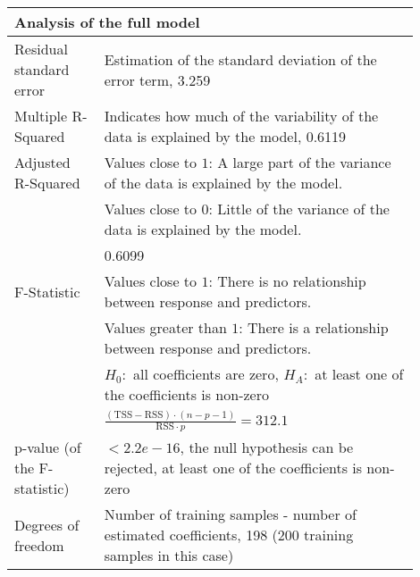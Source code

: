 {\begin{minipage}{\linewidth}
\begin{table}[H]
\begin{tabular}{|p{0.2\linewidth}|p{0.7\linewidth}|}
					\hline
					\multicolumn{2}{|l|}{\textbf{Analysis of the full model}}\\
					\hline
					Residual standard error
						& Estimation of the standard deviation of the error term, 3.259 \\
					Multiple R-Squared
						& Indicates how much of the variability of the data is explained by the model, 0.6119 \\
					Adjusted R-Squared
						& Values close to $1$: A large part of the variance of the data is explained by the model.\\
						& Values close to $0$: Little of the variance of the data is explained by the model.\\
						& 0.6099 \\
					F-Statistic
						& Values close to $1$: There is no relationship between response and predictors.\\
						& Values greater than $1$: There is a relationship between response and predictors.\\
						& $H_0:$ all coefficients are zero, $H_A:$ at least one of the coefficients is non-zero\\
						& $\frac{(\mathrm{TSS}-\mathrm{RSS})\cdot (n-p-1)}{\mathrm{RSS}\cdot p} = 312.1$\\
					p-value (of the F-statistic)
						& $<2.2e-16$, the null hypothesis can be rejected, at least one of the coefficients is non-zero\\
					Degrees of freedom
						& Number of training samples - number of estimated coefficients, 198 (200 training samples in this case)\\					
					\hline
				\end{tabular}
			\end{table}
		\end{minipage}
	}
